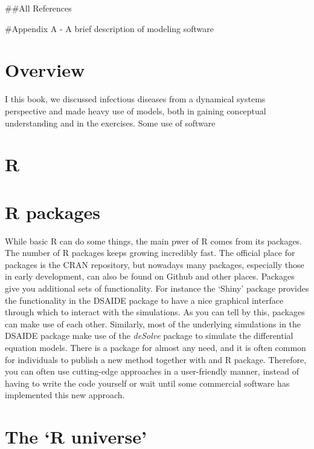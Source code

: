 \documentclass[]{book}
\theoremstyle{definition}
\theoremstyle{definition}
\theoremstyle{definition}
\theoremstyle{remark}
\begin{document}
\#\#All References

\#Appendix A - A brief description of modeling software

\hypertarget{overview}{%
\section{Overview}\label{overview}}

I this book, we discussed infectious diseases from a dynamical systems
perspective and made heavy use of models, both in gaining conceptual
understanding and in the exercises. Some use of software

\hypertarget{r}{%
\section{R}\label{r}}

\hypertarget{r-packages}{%
\section{R packages}\label{r-packages}}

While basic R can do some things, the main pwer of R comes from its
packages. The number of R packages keeps growing incredibly fast. The
official place for packages is the CRAN repository, but nowadays many
packages, especially those in early development, can also be found on
Github and other places. Packages give you additional sets of
functionality. For instance the `Shiny' package provides the
functionality in the DSAIDE package to have a nice graphical interface
through which to interact with the simulations. As you can tell by this,
packages can make use of each other. Similarly, most of the underlying
simulations in the DSAIDE package make use of the \emph{deSolve} package
to simulate the differential equation models. There is a package for
almost any need, and it is often common for individuals to publish a new
method together with and R package. Therefore, you can often use
cutting-edge approaches in a user-friendly manner, instead of having to
write the code yourself or wait until some commercial software has
implemented this new approach.

\hypertarget{the-r-universe}{%
\section{The `R universe'}\label{the-r-universe}}
\end{document}
